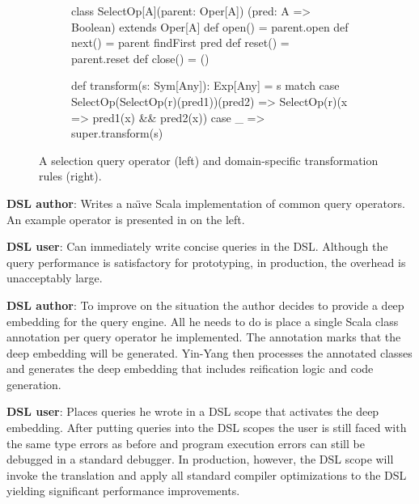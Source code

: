 \documentclass{llncs}
\newcommand{\tool}{Yin-Yang\xspace}
\begin{document}
\lstset{mathescape=false}
\begin{figure*}[ht]
\begin{multicols}{2}
\begin{subfigure}[b]{1\linewidth}
\centering

\begin{listingtiny}
class SelectOp[A](parent: Oper[A])
  (pred: A => Boolean) extends Oper[A]{
  def open() = parent.open
  def next() = parent findFirst pred
  def reset() = parent.reset
  def close() = ()
}
\end{listingtiny}
\label{lst:shallow}
\end{subfigure}

\begin{subfigure}[b]{1\linewidth}
\begin{listingtiny}

def transform(s: Sym[Any]): Exp[Any] = s match {
  case SelectOp(SelectOp(r)(pred1))(pred2) =>
    SelectOp(r)(x => pred1(x) && pred2(x))
  case _ => super.transform(s)
}

\end{listingtiny}

\end{subfigure}
\end{multicols}
\caption{\label{lst:select} A selection query operator (left) and domain-specific transformation rules (right).}
\end{figure*}

  {\bf DSL author}: Writes a na\"{\i}ve Scala implementation of common query operators. An example operator is presented in  on the left.

  {\bf DSL user}: Can immediately write concise queries in the DSL. Although the query performance is satisfactory for prototyping, in production, the overhead is unacceptably large.

  {\bf DSL author}: To improve on the situation the author decides to provide a deep embedding for the query engine. All he needs to do is place a single Scala class annotation per query operator he implemented. The annotation marks that the deep embedding will be generated. \tool then processes the annotated classes and generates the deep embedding that includes reification logic and code generation.

  {\bf DSL user}: Places queries he wrote in a DSL scope that activates the deep embedding. After putting queries into the DSL scopes the user is still faced with the same type errors as before and program execution errors can still be debugged in a standard debugger. In production, however, the DSL scope will invoke the translation and apply all standard compiler optimizations to the DSL yielding significant performance improvements.
\end{document}
